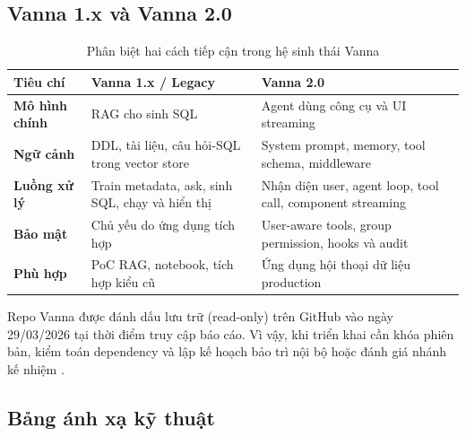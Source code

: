 \documentclass[12pt,a4paper]{article}
\begin{document}
\subsection{Vanna 1.x và Vanna 2.0}

\begin{table}[H]
\centering
\caption{Phân biệt hai cách tiếp cận trong hệ sinh thái Vanna}
\begin{tabularx}{\textwidth}{>{\bfseries}p{3.0cm}X X}
\toprule
Tiêu chí & Vanna 1.x / Legacy & Vanna 2.0\\
\midrule
Mô hình chính & RAG cho sinh SQL & Agent dùng công cụ và UI streaming\\
Ngữ cảnh & DDL, tài liệu, câu hỏi-SQL trong vector store &
System prompt, memory, tool schema, middleware\\
Luồng xử lý & Train metadata, ask, sinh SQL, chạy và hiển thị &
Nhận diện user, agent loop, tool call, component streaming\\
Bảo mật & Chủ yếu do ứng dụng tích hợp &
User-aware tools, group permission, hooks và audit\\
Phù hợp & PoC RAG, notebook, tích hợp kiểu cũ &
Ứng dụng hội thoại dữ liệu production\\
\bottomrule
\end{tabularx}
\end{table}

Repo Vanna được đánh dấu lưu trữ (read-only) trên GitHub vào ngày 29/03/2026
tại thời điểm truy cập báo cáo. Vì vậy, khi triển khai cần khóa phiên bản,
kiểm toán dependency và lập kế hoạch bảo trì nội bộ hoặc đánh giá nhánh kế
nhiệm \cite{vanna2026}.

\subsection{Bảng ánh xạ kỹ thuật}
\end{document}
